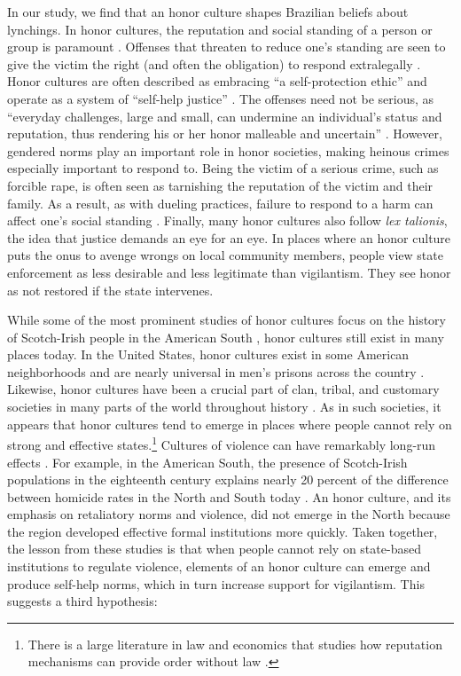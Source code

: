 \documentclass[12pt,ansiapaper]{article}
\begin{document}
In our study, we find that an honor culture shapes Brazilian beliefs about lynchings. In honor cultures, the reputation and social standing of a person or group is paramount \citep{nisbett2018culture,crowder2017new, vandello2008us, Cao2021honor}. Offenses that threaten to reduce one's standing are seen to give the victim the right (and often the obligation) to respond extralegally \citep{brown2016honor}. Honor cultures are often described as embracing ``a self-protection ethic'' and operate as a system of ``self-help justice'' \citep[1287, 1290]{grosjean2014history}. The offenses need not be serious, as ``everyday challenges, large and small, can undermine an individual's status and reputation, thus rendering his or her honor malleable and uncertain'' \citep[522]{crowder2017new}. However, gendered norms play an important role in honor societies, making heinous crimes especially important to respond to. Being the victim of a serious crime, such as forcible rape, is often seen as tarnishing the reputation of the victim and their family. As a result, as with dueling practices, failure to respond to a harm can affect one's social standing \citep{allen2006duel}. Finally, many honor cultures also follow \textit{lex talionis}, the idea that justice demands an eye for an eye. In places where an honor culture puts the onus to avenge wrongs on local community members, people view state enforcement as less desirable and less legitimate than vigilantism. They see honor as not restored if the state intervenes. 

While some of the most prominent studies of honor cultures focus on the history of Scotch-Irish people in the American South \citep[for example,][662-668]{fischer1989albion}, honor cultures still exist in many places today. In the United States, honor cultures exist in some American neighborhoods and are nearly universal in men's prisons across the country \citep{anderson2000code,fleisher2009myth}. Likewise, honor cultures have been a crucial part of clan, tribal, and customary societies in many parts of the world throughout history \citep{weiner2013rule}. As in such societies, it appears that honor cultures tend to emerge in places where people cannot rely on strong and effective states.\footnote{There is a large literature in law and economics that studies how reputation mechanisms can provide order without law \citep{bernstein1992opting,ellickson1991order,greif2006institutions, leeson2014anarchy}.} Cultures of violence can have remarkably long-run effects \citep{vandello2008us}. For example, in the American South, the presence of Scotch-Irish populations in the eighteenth century explains nearly 20 percent of the difference between homicide rates in the North and South today \citep[1286]{grosjean2014history}. An honor culture, and its emphasis on retaliatory norms and violence, did not emerge in the North because the region developed effective formal institutions more quickly. Taken together, the lesson from these studies is that when people cannot rely on state-based institutions to regulate violence, elements of an honor culture can emerge and produce self-help norms, which in turn increase support for vigilantism. This suggests a third hypothesis: 
\end{document}
